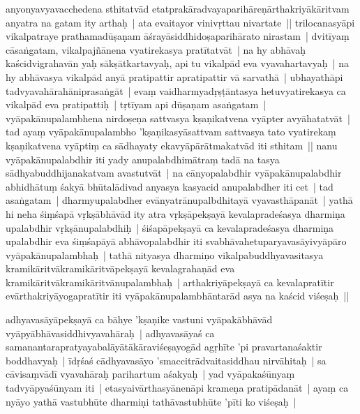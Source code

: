 \documentclass[article,12pt,a4paper]{memoir}%
\newcommand{\persName}[1]{#1}
\newcounter{parCount}
\begin{document}
anyonyavyavacchedena sthitatvād etatprakāradvayaparihāreṇārthakriyākāritvam anyatra na gatam ity arthaḥ | ata evaitayor vinivṛttau nivartate || \label{thakur75-91.17} \persName{trilocanasyā}pi vikalpatraye prathamadūṣaṇam āśrayāsiddhidoṣaparihārato nirastam | \label{thakur75-91.18} dvitīyaṃ cāsaṅgatam, vikalpajñānena vyatirekasya pratītatvāt | na hy abhāvaḥ kaścidvigrahavān yaḥ sākṣātkartavyaḥ, api tu vikalpād eva vyavahartavyaḥ | na hy abhāvasya vikalpād anyā pratipattir apratipattir vā sarvathā | ubhayathāpi tadvyavahārahāniprasaṅgāt | evaṃ vaidharmyadṛṣṭāntasya hetuvyatirekasya ca vikalpād eva pratipattiḥ | \label{thakur75-91.22} tṛtīyam api dūṣaṇam asaṅgatam | vyāpakānupalambhena nirdoṣeṇa sattvasya kṣaṇikatvena vyāpter avyāhatatvāt | \label{thakur75-91.23} tad ayaṃ vyāpakānupalambho 'kṣaṇikasyāsattvam sattvasya tato vyatirekaṃ kṣaṇikatvena vyāptiṃ ca sādhayaty ekavyāpārātmakatvād iti sthitam || \label{thakur75-91.25} nanu vyāpakānupalabdhir iti yady anupalabdhimātraṃ tadā na tasya sādhyabuddhijanakatvam avastutvāt | na cānyopalabdhir vyāpakānupalabdhir abhidhātuṃ śakyā bhūtalādivad anyasya kasyacid anupalabdher iti cet | \label{thakur75-91.27} tad asaṅgatam | dharmyupalabdher evānyatrānupalbdhitayā vyavasthāpanāt | yathā hi neha śiṃśapā vṛkṣābhāvād ity atra vṛkṣāpekṣayā kevalapradeśasya dharmiṇa upalabdhir vṛkṣānupalabdhiḥ | śiśapāpekṣayā ca kevalapradeśasya dharmiṇa upalabdhir eva śiṃśapāyā abhāvopalabdhir iti svabhāvahetuparyavasāyivyāpāro vyāpakānupalambhaḥ | tathā nityasya dharmiṇo vikalpabuddhyavasitasya kramikāritvākramikāritvāpekṣayā kevalagrahaṇād eva kramikāritvākramikāritvānupalambhaḥ | arthakriyāpekṣayā ca kevalapratītir evārthakriyāyogapratītir iti vyāpakānupalambhāntarād asya na kaścid viśeṣaḥ ||
	{}
	\pend%
      

	  
	  \pstart \leavevmode%
	\label{thakur75-92.5}adhyavasāyāpekṣayā ca bāhye 'kṣaṇike vastuni vyāpakābhāvād vyāpyābhāvasiddhivyavahāraḥ | adhyavasāyaś ca samanantarapratyayabalāyātākāraviśeṣayogād agṛhīte 'pi pravartanaśaktir boddhavyaḥ | īdṛśaś cādhyavasāyo 'smaccitrādvaitasiddhau nirvāhitaḥ | sa cāvisaṃvādī vyavahāraḥ parihartum aśakyaḥ | yad vyāpakaśūnyaṃ tadvyāpyaśūnyam iti | etasyaivārthasyānenāpi krameṇa pratipādanāt | ayaṃ ca nyāyo yathā vastubhūte dharmiṇi tathāvastubhūte 'pīti ko viśeṣaḥ | 
	{}
	\pend%
      
\end{document}
